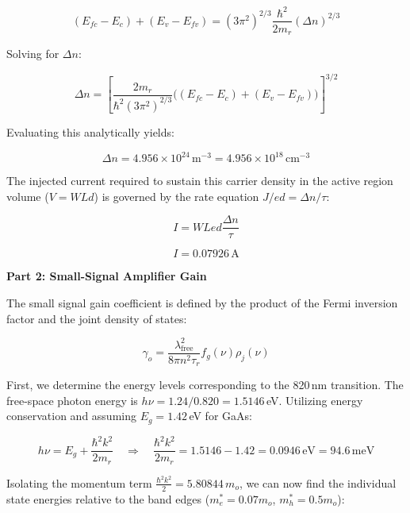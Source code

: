 \begin{equation*}
  (E_{fc} - E_c) + (E_v - E_{fv}) = \left(3\pi^2\right)^{2/3} \frac{\hbar^2}{2 m_r} (\Delta n)^{2/3}
\end{equation*}

Solving for $\Delta n$:

\begin{equation*}
  \Delta n = \left[ \frac{2 m_r}{\hbar^2 \left(3\pi^2\right)^{2/3}} \big( (E_{fc} - E_c) + (E_v - E_{fv}) \big) \right]^{3/2}
\end{equation*}

Evaluating this analytically yields:

\begin{equation*}
  \Delta n = 4.956 \times 10^{24}\,\text{m}^{-3} = 4.956 \times 10^{18}\,\text{cm}^{-3}
\end{equation*}

The injected current required to sustain this carrier density in the active region volume ($V = WLd$) is governed by the rate equation $J/ed = \Delta n/\tau$:

\begin{equation*}
  I = W L e d \frac{\Delta n}{\tau}
\end{equation*}

\begin{equation*}
  \boxed{I = 0.07926\,\text{A}}
\end{equation*}

\textbf{Part 2: Small-Signal Amplifier Gain}

The small signal gain coefficient is defined by the product of the Fermi inversion factor and the joint density of states:

\begin{equation*}
  \gamma_o = \frac{\lambda_{\text{free}}^2}{8\pi n^2 \tau_r} f_g(\nu) \rho_j(\nu)
\end{equation*}

First, we determine the energy levels corresponding to the 820\,nm transition. The free-space photon energy is $h\nu = 1.24/0.820 = 1.5146$\,eV. Utilizing energy conservation and assuming $E_g = 1.42$\,eV for GaAs:

\begin{equation*}
  h\nu = E_g + \frac{\hbar^2 k^2}{2 m_r} \quad\Longrightarrow\quad \frac{\hbar^2 k^2}{2 m_r} = 1.5146 - 1.42 = 0.0946\,\text{eV} = 94.6\,\text{meV}
\end{equation*}

Isolating the momentum term $\frac{\hbar^2 k^2}{2} = 5.80844\,m_o$, we can now find the individual state energies relative to the band edges ($m_e^* = 0.07 m_o$, $m_h^* = 0.5 m_o$):

